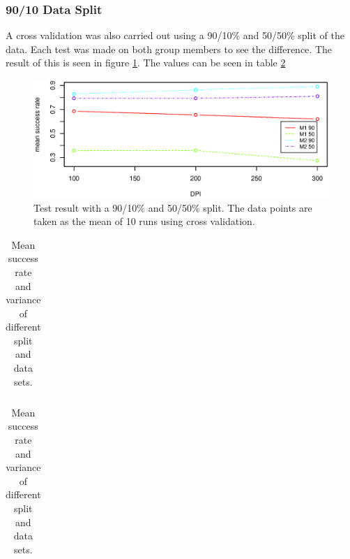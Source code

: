 \subsubsection{90/10 Data Split}
A cross validation was also carried out using a 90/10\% and 50/50\% split of the data. 
Each test was made on both group members to see the difference.
The result of this is seen in figure \ref{fig:PersonDependent_9010}.
The values can be seen in table \ref{tb:cross}

\begin{figure}[h]
\centering
\includegraphics[width=\textwidth]{graphics/cross_test}
\caption[Cross validation]{Test result with a 90/10\% and 50/50\% split. The data points are taken as the mean of 10 runs using cross validation.}
\label{fig:PersonDependent_9010}
\end{figure}

\begin{table}[h]
\centering
    \begin{subtable}[b]{0.56\textwidth}
    \centering
        \begin{tabular}{lcccccc}
            
        \end{tabular}
        \caption{Mean success rate.}
    \end{subtable}
    \begin{subtable}[b]{0.48\textwidth}
    \centering
        \begin{tabular}{lcccccc}
            
        \end{tabular}
        \caption{Variance in success rate.}
    \end{subtable}
    \caption[Success of functions.]{Mean success rate and variance of different split and data sets.}
    \label{tb:cross}
\end{table}



